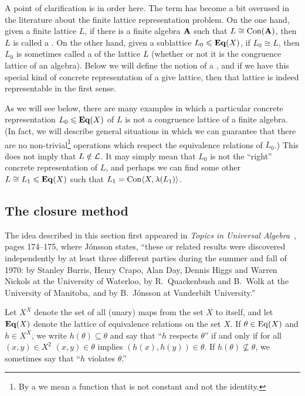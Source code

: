 A point of clarification is in order here.  The term 
has become a bit overused in the literature about the finite lattice
representation problem.  On the one hand, given a finite lattice $L$, if there
is a finite algebra $\mathbf{A}$ such that $L \cong \operatorname{Con}(\mathbf{A})$, then $L$ is called a
.  On the other hand, given a sublattice 
$L_0\leqslant \mathbf{Eq}(X)$, if $L_0\cong L$, then $L_0$ is sometimes called a 
of the lattice $L$ (whether or not it is the congruence lattice of an algebra).    
Below we will define the notion of a , and if we
have this special kind of concrete representation of a give lattice, then that
lattice is indeed representable in the first sense.

As we will see below, there are many examples in which a particular concrete
representation $L_0\leqslant \mathbf{Eq}(X)$ of $L$ is not a congruence lattice of a
finite algebra.  (In fact, we will describe general situations in which we can
guarantee that there are no non-trivial\footnote{By a 
   we mean a function that is
  not constant and not the identity.} operations which respect the equivalence
relations of $L_0$.)  This does not imply that $L \notin \mathcal{L}$.  It may
simply mean that $L_0$ is not the ``right'' concrete representation of $L$, and
perhaps we can find some other $L \cong L_1\leqslant \mathbf{Eq}(X)$ such that $L_1 = \operatorname{Con}
\langle X, \lambda(L_1)\rangle$.

\subsection{The closure method}
\label{sec:closure-method}
The idea described in this section
first appeared in \emph{Topics in Universal Algebra}~\cite{Jonsson:1972}, pages
174--175, where J\'onsson states, ``these or related results were discovered
independently by at least three different parties during the summer and fall of
1970: by Stanley Burris, Henry Crapo, Alan Day, Dennis Higgs and Warren Nickols
at the University of Waterloo, by R.~Quackenbush and B.~Wolk at the University
of Manitoba, and by B.~J\'{o}nsson at Vanderbilt University.''

Let $X^X$ denote the set of all (unary) maps from the set $X$ to itself, and let 
$\mathbf{Eq}(X)$ denote the lattice of equivalence relations on the set $X$.  If $\theta
\in \operatorname{Eq}(X)$ and $h\in X^X$, we write $h(\theta) \subseteq \theta$ and say
that ``$h$ respects $\theta$'' if and only if for all $(x,y)\in X^2$ $(x,y)\in
\theta$ implies 
$(h(x),h(y)) \in \theta$.  If $h(\theta) \nsubseteq \theta$, we sometimes say
that ``$h$ violates $\theta$.''

